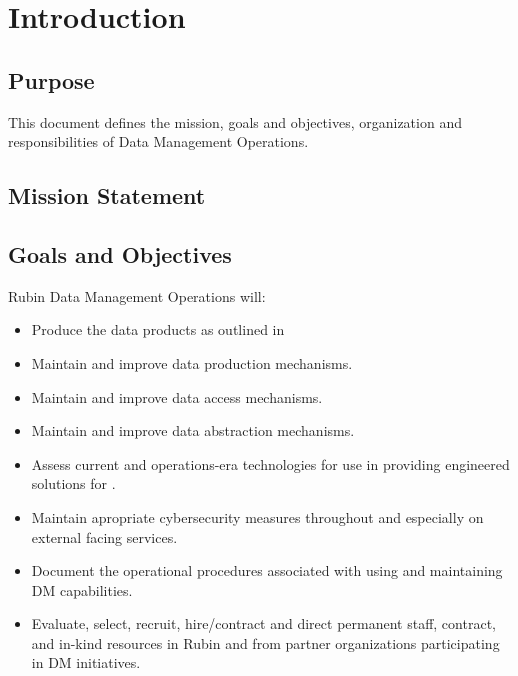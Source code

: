 \section {Introduction}\label{sec:intro}
\subsection{Purpose}
This document defines the mission, goals and objectives, organization and responsibilities of
 \VRO Data Management Operations.

\subsection{Mission Statement}


\subsection{Goals and Objectives}
Rubin Data Management Operations will:
\begin{itemize}
\item Produce the data products as outlined in 
\item Maintain and improve data production mechanisms.
\item Maintain and improve data access mechanisms.
\item Maintain and improve data abstraction mechanisms.
\item Assess current and operations-era technologies for use in providing engineered solutions for \VRO.
\item Maintain apropriate cybersecurity measures throughout \VRO and especially on external facing services.
\item Document the operational procedures associated with using and maintaining DM capabilities.
\item Evaluate, select, recruit, hire/contract and direct permanent staff, contract, and in-kind resources in Rubin and from partner organizations participating in DM initiatives.

\end{itemize}

